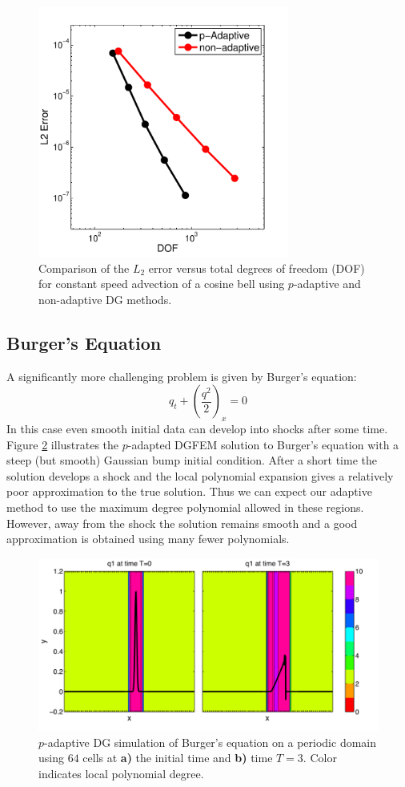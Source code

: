 \documentclass[10]{amsart}
\begin{document}
\begin{figure}
\hfil\includegraphics[width=3.25in]{figures/efficency.pdf}\hfil
\caption{Comparison of the $L_2$ error versus total degrees of freedom (DOF) for constant speed advection of a cosine bell using $p$-adaptive and non-adaptive DG methods. } \label{cosbellEfficiency}
\end{figure}

\subsection{Burger's Equation}
A significantly more challenging problem is given by Burger's equation:
\begin{equation*}
q_t + \left( \frac{q^2}{2}\right)_x = 0
\end{equation*}
In this case even smooth initial data can develop into shocks after some time. Figure \ref{burgersGaussian} illustrates the $p$-adapted DGFEM solution to Burger's equation with a steep (but smooth) Gaussian bump initial condition. After a short time the solution develops a shock and the local polynomial expansion gives a relatively poor approximation to the true solution. Thus we can expect our adaptive method to use the maximum degree polynomial allowed in these regions. However, away from the shock the solution remains smooth and a good approximation is obtained using many fewer polynomials. 

\begin{figure}
\hfil\includegraphics[width=5in]{figures/burgers_heat.pdf}\hfil
\caption{$p$-adaptive DG simulation of Burger's equation on a periodic domain using $64$ cells at {\bf a)} the initial time and {\bf b)} time $T=3$. Color indicates local polynomial degree. }
\label{burgersGaussian}
\end{figure}
\end{document}
